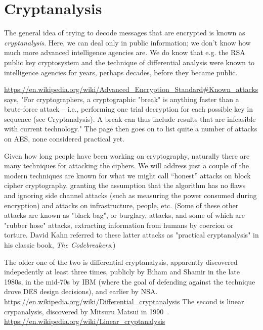 \section{Cryptanalysis}
\label{sec:cryptan}


The general idea of trying to decode messages that are encrypted is
known as \emph{cryptanalysis}.  Here, we can deal only in public information;
we don't know how much more advanced intelligence agencies are.  We do
know that e.g. the RSA public key cryptosystem and the technique of
differential analysis were known to intelligence agencies for years,
perhaps decades, before they became public. 

\url{https://en.wikipedia.org/wiki/Advanced_Encryption_Standard#Known_attacks}
says, "For cryptographers, a cryptographic "break" is anything faster
than a brute-force attack – i.e., performing one trial decryption for
each possible key in sequence (see Cryptanalysis). A break can thus
include results that are infeasible with current technology."
The page then goes on to list quite a number of attacks on AES, none
considered practical yet.

Given how long people have been working on cryptography, naturally
there are many techniques for attacking the ciphers.  We will address
just a couple of the modern techniques are known for what we might
call ``honest'' attacks on block cipher cryptography, granting the
assumption that the algorithm has no flaws and ignoring side channel
attacks (such as measuring the power consumed during encryption) and
attacks on infrastructure, people, etc.  (Some of these other attacks
are known as "black bag", or burglary, attacks, and some of which are
"rubber hose" attacks, extracting information from humans by coercion
or torture.  David Kahn referred to these latter attacks as
"practical cryptanalysis" in his classic book, \emph{The
  Codebreakers}.)

The older one of the two is differential cryptanalysis, apparently
discovered indepedently at least three times, publicly by Biham and
Shamir in the late 1980s, in the mid-70s by IBM (where the goal of
defending against the technique drove DES design decisions), and
earlier by NSA.
\url{https://en.wikipedia.org/wiki/Differential_cryptanalysis}
The second is linear crypanalysis, discovered by Mitsuru Matsui in
1990~\cite{matsui1993linear}.
\url{https://en.wikipedia.org/wiki/Linear_cryptanalysis}

